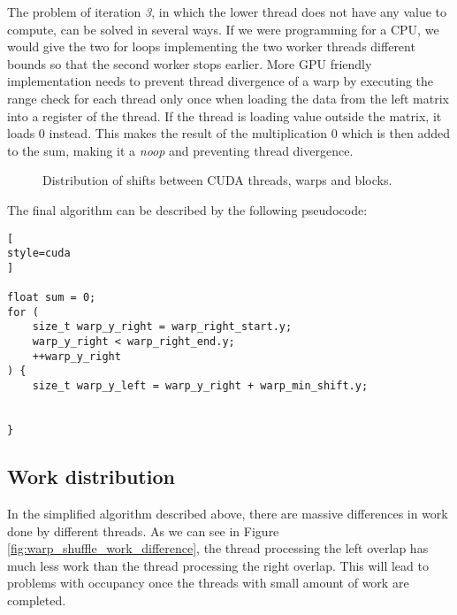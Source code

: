 The problem of iteration \textit{3}, in which the lower thread does not have any value to compute, can be solved in several ways. If we were programming for a CPU, we would give the two for loops implementing the two worker threads different bounds so that the second worker stops earlier. More GPU friendly implementation needs to prevent thread divergence of a warp by executing the range check for each thread only once when loading the data from the left matrix into a register of the thread. If the thread is loading value outside the matrix, it loads 0 instead. This makes the result of the multiplication 0 which is then added to the sum, making it a \textit{noop} and preventing thread divergence.


\begin{figure}[h]
	\centering
	\def\svgwidth{0.8\textwidth}
	
	\caption{Distribution of shifts between CUDA threads, warps and blocks.}
	\label{fig:warp_shuffle_simple_dist}
\end{figure}


The final algorithm can be described by the following pseudocode:

\begin{lstlisting}[
style=cuda
]

float sum = 0;
for (
	size_t warp_y_right = warp_right_start.y; 
	warp_y_right < warp_right_end.y;
	++warp_y_right 
) {
	size_t warp_y_left = warp_y_right + warp_min_shift.y;
	
	
}
\end{lstlisting}



\subsection{Work distribution}

In the simplified algorithm described above, there are massive differences in work done by different threads. As we can see in Figure \ref{fig:warp_shuffle_work_difference}, the thread processing the left overlap has much less work than the thread processing the right overlap. This will lead to problems with occupancy once the threads with small amount of work are completed. 

